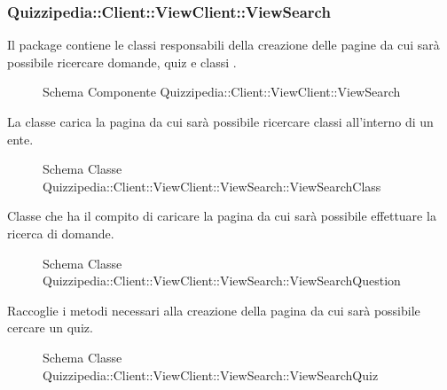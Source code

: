 \subsubsection{Quizzipedia::Client::ViewClient::ViewSearch}
Il package contiene le classi responsabili della creazione delle pagine da cui sarà possibile ricercare domande, quiz e classi .
\begin{figure}[H]
\centering
\noindent{}
\caption{Schema Componente Quizzipedia::Client::ViewClient::ViewSearch}
\end{figure}
La classe carica la pagina da cui sarà possibile ricercare classi all'interno di un ente.
\begin{figure}[H]
\centering
\noindent{}
\caption{Schema Classe Quizzipedia::Client::ViewClient::ViewSearch::ViewSearchClass}
\end{figure}
Classe che ha il compito di caricare la pagina da cui sarà possibile effettuare la ricerca di domande.
\begin{figure}[H]
\centering
\noindent{}
\caption{Schema Classe Quizzipedia::Client::ViewClient::ViewSearch::ViewSearchQuestion}
\end{figure}
Raccoglie i metodi necessari alla creazione della pagina da cui sarà possibile cercare un quiz.
\begin{figure}[H]
\centering
\noindent{}
\caption{Schema Classe Quizzipedia::Client::ViewClient::ViewSearch::ViewSearchQuiz}
\end{figure}
